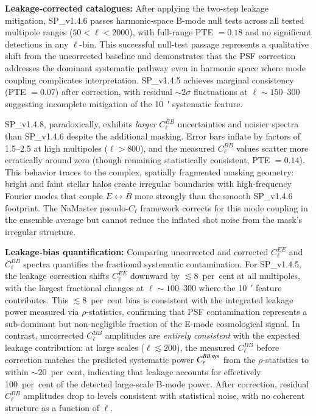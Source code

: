 \documentclass{aa}
\begin{document}
\textbf{Leakage-corrected catalogues:} After applying the two-step leakage mitigation, SP\_v1.4.6 passes harmonic-space B-mode null tests across all tested multipole ranges ($50 < \ell < 2000$), with full-range PTE $= 0.18$ and no significant detections in any $\ell$-bin. This successful null-test passage represents a qualitative shift from the uncorrected baseline and demonstrates that the PSF correction addresses the dominant systematic pathway even in harmonic space where mode coupling complicates interpretation. SP\_v1.4.5 achieves marginal consistency (PTE $= 0.07$) after correction, with residual $\sim 2\sigma$ fluctuations at $\ell \sim 150$--$300$ suggesting incomplete mitigation of the \SI{10}{\arcmin} systematic feature.

SP\_v1.4.8, paradoxically, exhibits \emph{larger} $C_\ell^{BB}$ uncertainties and noisier spectra than SP\_v1.4.6 despite the additional masking. Error bars inflate by factors of \num{1.5}--\num{2.5} at high multipoles ($\ell > 800$), and the measured $C_\ell^{BB}$ values scatter more erratically around zero (though remaining statistically consistent, PTE $= 0.14$). This behavior traces to the complex, spatially fragmented masking geometry: bright and faint stellar halos create irregular boundaries with high-frequency Fourier modes that couple $E \leftrightarrow B$ more strongly than the smooth SP\_v1.4.6 footprint. The NaMaster pseudo-$C_\ell$ framework corrects for this mode coupling in the ensemble average but cannot reduce the inflated shot noise from the mask's irregular structure.

\textbf{Leakage-bias quantification:} Comparing uncorrected and corrected $C_\ell^{EE}$ and $C_\ell^{BB}$ spectra quantifies the fractional systematic contamination. For SP\_v1.4.5, the leakage correction shifts $C_\ell^{EE}$ downward by $\lesssim 8$~per~cent at all multipoles, with the largest fractional changes at $\ell \sim 100$--$300$ where the \SI{10}{\arcmin} feature contributes. This $\lesssim 8$~per~cent bias is consistent with the integrated leakage power measured via $\rho$-statistics, confirming that PSF contamination represents a sub-dominant but non-negligible fraction of the E-mode cosmological signal. In contrast, uncorrected $C_\ell^{BB}$ amplitudes are \emph{entirely consistent} with the expected leakage contribution: at large scales ($\ell \lesssim 200$), the measured $C_\ell^{BB}$ before correction matches the predicted systematic power $C_\ell^{BB,\rm sys}$ from the $\rho$-statistics to within $\sim 20$~per~cent, indicating that leakage accounts for effectively \num{100}~per~cent of the detected large-scale B-mode power. After correction, residual $C_\ell^{BB}$ amplitudes drop to levels consistent with statistical noise, with no coherent structure as a function of $\ell$.
\end{document}
